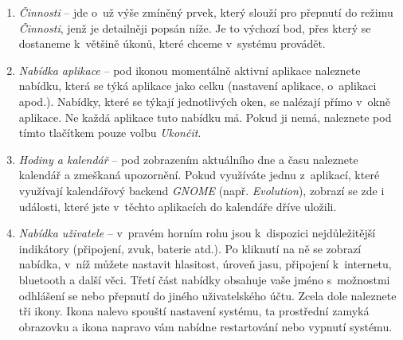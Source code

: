 \begin{enumerate}
\item\emph{Činnosti} -- jde o~už výše zmíněný prvek, který slouží pro přepnutí do režimu \emph{Činnosti}, jenž je detailněji popsán níže. Je to výchozí bod, přes který se dostaneme k~většině úkonů, které chceme v~systému provádět.

\item\emph{Nabídka aplikace} -- pod ikonou momentálně aktivní aplikace naleznete nabídku, která se týká aplikace jako celku (nastavení aplikace, o~aplikaci apod.). Nabídky, které se týkají jednotlivých oken, se nalézají přímo v~okně aplikace. Ne každá aplikace tuto nabídku má. Pokud ji nemá, naleznete pod tímto tlačítkem pouze volbu \emph{Ukončit}.


\item\emph{Hodiny a kalendář} -- pod zobrazením aktuálního dne a času naleznete kalendář a zmeškaná upozornění. Pokud využíváte jednu z~aplikací, které využívají kalendářový backend \emph{GNOME} (např. \emph{Evolution}), zobrazí se zde i události, které jste v~těchto aplikacích do kalendáře dříve uložili.



\item\emph{Nabídka uživatele} -- v~pravém horním rohu jsou k~dispozici nejdůležitější indikátory (připojení, zvuk, baterie atd.). Po kliknutí na ně se zobrazí nabídka, v~níž můžete nastavit hlasitost, úroveň jasu, připojení k~internetu, bluetooth a další věci. Třetí část nabídky obsahuje vaše jméno s~možnostmi odhlášení se nebo přepnutí do jiného uživatelského účtu. Zcela dole naleznete tři ikony. Ikona nalevo spouští nastavení systému, ta prostřední zamyká obrazovku a ikona napravo vám nabídne restartování nebo vypnutí systému.
\end{enumerate}


